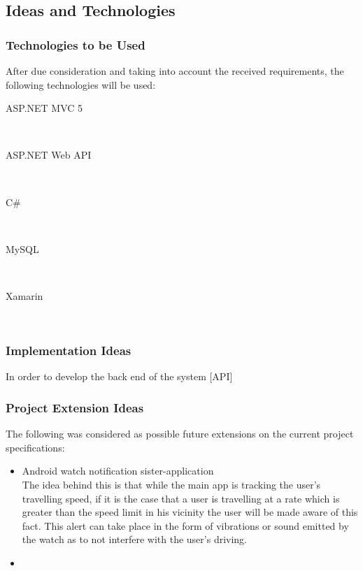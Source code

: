\subsection{Ideas and Technologies}
\subsubsection{Technologies to be Used}
After due consideration and taking into account the received requirements, the following technologies will be used:
\begin{description}
	\item[ASP.NET MVC 5]\hfill\\
	\item[ASP.NET Web API]\hfill\\
	
	\item[C\#]\hfill\\
	
	\item[MySQL]\hfill\\	
	
	\item[Xamarin]\hfill\\
	
	
\end{description}
	
\subsubsection{Implementation Ideas}	
In order to develop the back end of the system [API]

	
\subsubsection{Project Extension Ideas}
The following was considered as possible future extensions on the current project specifications:

\begin{itemize}
	\item Android watch notification sister-application\\
	The idea behind this is that while the main app is tracking the user's travelling speed, if it is the case that a user is travelling at a rate which is greater than the speed limit in his vicinity the user will be made aware of this fact. This alert can take place in the form of vibrations or sound emitted by the watch as to not interfere with the user's driving.
	
	\item 
\end{itemize}